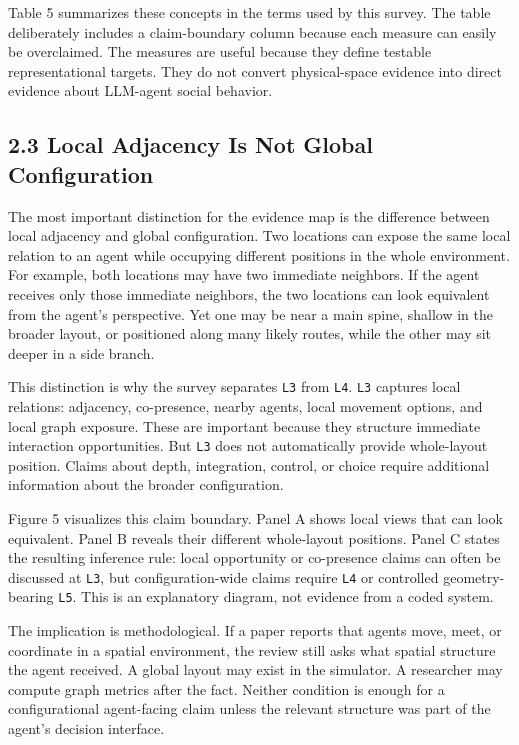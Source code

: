 \documentclass[
  twocolumn]{article}
\begin{document}
Table 5 summarizes these concepts in the terms used by this survey. The
table deliberately includes a claim-boundary column because each measure
can easily be overclaimed. The measures are useful because they define
testable representational targets. They do not convert physical-space
evidence into direct evidence about LLM-agent social behavior.

\subsection{2.3 Local Adjacency Is Not Global
Configuration}\label{local-adjacency-is-not-global-configuration}

The most important distinction for the evidence map is the difference
between local adjacency and global configuration. Two locations can
expose the same local relation to an agent while occupying different
positions in the whole environment. For example, both locations may have
two immediate neighbors. If the agent receives only those immediate
neighbors, the two locations can look equivalent from the agent's
perspective. Yet one may be near a main spine, shallow in the broader
layout, or positioned along many likely routes, while the other may sit
deeper in a side branch.

This distinction is why the survey separates \texttt{L3} from
\texttt{L4}. \texttt{L3} captures local relations: adjacency,
co-presence, nearby agents, local movement options, and local graph
exposure. These are important because they structure immediate
interaction opportunities. But \texttt{L3} does not automatically
provide whole-layout position. Claims about depth, integration, control,
or choice require additional information about the broader
configuration.

Figure 5 visualizes this claim boundary. Panel A shows local views that
can look equivalent. Panel B reveals their different whole-layout
positions. Panel C states the resulting inference rule: local
opportunity or co-presence claims can often be discussed at \texttt{L3},
but configuration-wide claims require \texttt{L4} or controlled
geometry-bearing \texttt{L5}. This is an explanatory diagram, not
evidence from a coded system.

The implication is methodological. If a paper reports that agents move,
meet, or coordinate in a spatial environment, the review still asks what
spatial structure the agent received. A global layout may exist in the
simulator. A researcher may compute graph metrics after the fact.
Neither condition is enough for a configurational agent-facing claim
unless the relevant structure was part of the agent's decision
interface.
\end{document}
